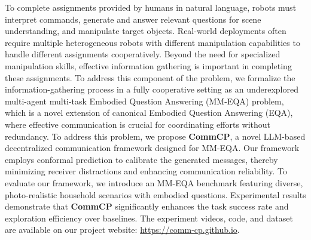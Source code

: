 To complete assignments provided by humans in natural language, robots must interpret commands, generate and answer relevant questions for scene understanding, and manipulate target objects.
Real-world deployments often require multiple heterogeneous robots with different manipulation capabilities to handle different assignments cooperatively. 
Beyond the need for specialized manipulation skills, effective information gathering is important in completing these assignments. 
To address this component of the problem, we formalize the information-gathering process in a fully cooperative setting as an underexplored multi-agent multi-task Embodied Question Answering (MM-EQA) problem, which is a novel extension of canonical Embodied Question Answering (EQA), where effective communication is crucial for coordinating efforts without redundancy.
To address this problem, we propose \textbf{CommCP}, a novel LLM-based decentralized communication framework designed for MM-EQA. 
Our framework employs conformal prediction to calibrate the generated messages, thereby minimizing receiver distractions and enhancing communication reliability.
To evaluate our framework, we introduce an MM-EQA benchmark featuring diverse, photo-realistic household scenarios with embodied questions. 
Experimental results demonstrate that \textbf{CommCP} significantly enhances the task success rate and exploration efficiency over baselines. The experiment videos, code, and dataset are available on our project website: \url{https://comm-cp.github.io}.
